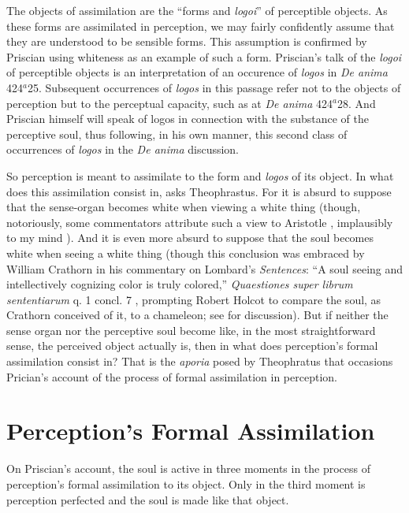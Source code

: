 \documentclass[12pt]{article}
\begin{document}
The objects of assimilation are the ``forms and \emph{logoi}'' of perceptible objects. As these forms are assimilated in perception, we may fairly confidently assume that they are understood to be sensible forms. This assumption is confirmed by Priscian using whiteness as an example of such a form. Priscian's talk of the \emph{logoi} of perceptible objects is an interpretation of an occurence of \emph{logos} in \emph{De anima} 424\( ^{a} \)25. Subsequent occurrences of \emph{logos} in this passage refer not to the objects of perception but to the perceptual capacity, such as at \emph{De anima} 424\( ^{a} \)28. And Priscian himself will speak of logos in connection with the substance of the perceptive soul, thus following, in his own manner, this second class of occurrences of \emph{logos} in the \emph{De anima} discussion. 

So perception is meant to assimilate to the form and \emph{logos} of its object. In what does this assimilation consist in, asks Theophrastus. For it is absurd to suppose that the sense-organ becomes white when viewing a white thing (though, notoriously, some commentators attribute such a view to Aristotle \citealt{Slakey:1961ss, Sorabji:1974fk,Everson:1997ep}, implausibly to my mind \citealt{Kalderon:2015fr}). And it is even more absurd to suppose that the soul becomes white when seeing a white thing (though this conclusion was embraced by William Crathorn in his commentary on Lombard's \emph{Sentences}: ``A soul seeing and intellectively cognizing color is truly colored,'' \emph{Quaestiones super librum sententiarum} q. 1 concl. 7 \citealt[288]{Pasnau:2002pb}, prompting Robert Holcot to compare the soul, as Crathorn conceived of it, to a chameleon; see \citealt[chapter 1.1]{Pasnau:1997aa} for discussion). But if neither the sense organ nor the perceptive soul become like, in the most straightforward sense, the perceived object actually is, then in what does perception's formal assimilation consist in? That is the \emph{aporia} posed by Theophratus that occasions Prician's account of the process of formal assimilation in perception.


\section{Perception's Formal Assimilation} %
\label{sec:perception_s_formal_assimilation}

On Priscian's account, the soul is active in three moments in the process of perception's formal assimilation to its object. Only in the third moment is perception perfected and the soul is made like that object. 
\end{document}
